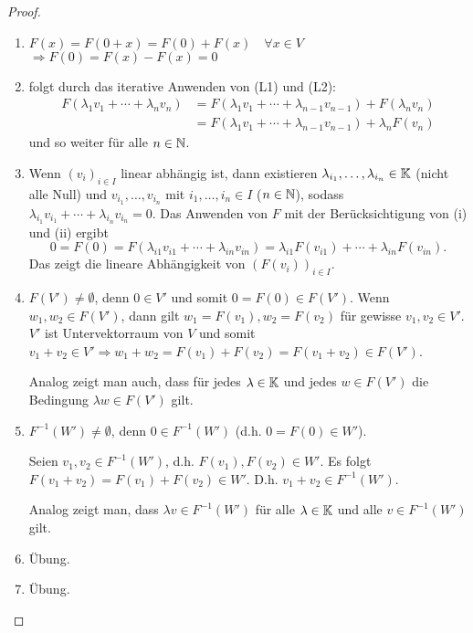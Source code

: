 \begin{proof}
	\begin{enumerate}
		\item
			$ F(x) = F(0+x) = F(0) + F(x) \quad \forall x \in V $
			$ \Rightarrow F(0) = F(x) - F(x) = 0 $
		\item
			folgt durch das iterative Anwenden von (L1) und (L2):
			\begin{align*}
				 F(\lambda_1 v_1 + \cdots + \lambda_n v_n ) &= F(\lambda_1 v_1 + \cdots + \lambda_{n-1} v_{n-1} ) + F(\lambda_n v_n) \\
				 &= F(\lambda_1 v_1 + \cdots + \lambda_{n-1} v_{n-1} ) + \lambda_n F(v_n)
			\end{align*}
			und so weiter für alle $ n \in \mathbb N $.
		\item
			Wenn $ (v_i)_{i \in I} $ linear abhängig ist, dann existieren $ \lambda_{i_1}, \ldots, \lambda_{i_n} \in \mathbb K $ (nicht alle Null) und $ v_{i_1}, \ldots, v_{i_n} $ mit $ i_1, \ldots, i_n \in I $ ($ n \in \mathbb N $), sodass $ \lambda_{i_1} v_{i_1} + \cdots + \lambda_{i_n} v_{i_n} = 0 $. Das Anwenden von $ F $ mit der Berücksichtigung von (i) und (ii) ergibt
			\begin{equation*}
				0 = F(0) = F(\lambda_{i1} v_{i1} + \cdots + \lambda_{in} v_{in} ) = \lambda_{i1} F(v_{i1}) + \cdots + \lambda_{in} F(v_{in}).
			\end{equation*}
			Das zeigt die lineare Abhängigkeit von $ (F(v_i))_{i \in I} $.
		\item
			$ F(V') \neq \emptyset $, denn $ 0 \in V' $ und somit $ 0 = F(0) \in F(V') $. Wenn $ w_1, w_2 \in F(V') $, dann gilt $ w_1 = F(v_1), w_2 = F(v_2) $ für gewisse $ v_1, v_2 \in V' $. $ V' $ ist Untervektorraum von $ V $ und somit $ v_1 + v_2 \in V' \Rightarrow w_1 + w_2 = F(v_1) + F(v_2) = F(v_1 + v_2) \in F(V') $.
			
			Analog zeigt man auch, dass für jedes $ \lambda \in \mathbb K $ und jedes $ w \in F(V') $ die Bedingung $ \lambda w \in F(V') $ gilt.
		\item
			$ F^{-1}(W') \neq \emptyset $, denn $ 0 \in F^{-1}(W') $ (d.h. $ 0 = F(0) \in W' $).
			
			Seien $ v_1, v_2 \in F^{-1}(W') $, d.h. $ F(v_1), F(v_2) \in  W' $. Es folgt $ F(v_1 + v_2) = F(v_1) + F(v_2) \in W' $. D.h. $ v_1 + v_2 \in F^{-1}(W') $.
			
			Analog zeigt man, dass $ \lambda v \in F^{-1}(W') $ für alle $ \lambda \in \mathbb K $ und alle $ v \in F^{-1}(W') $ gilt.
		\item
			Übung.
		\item
			Übung. \qedhere
	\end{enumerate}
\end{proof}

